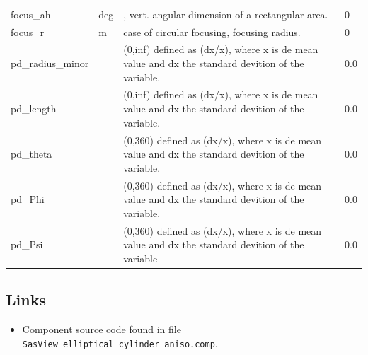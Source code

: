 \begin{longtable}{p{}p{}p{}p{}}
focus\_ah & deg & , vert. angular dimension of a rectangular area. & 0 \\
focus\_r & m & case of circular focusing, focusing radius. & 0 \\
pd\_radius\_minor &  & (0,inf) defined as (dx/x), where x is de mean value and dx the standard devition of the variable. & 0.0 \\
pd\_length &  & (0,inf) defined as (dx/x), where x is de mean value and dx the standard devition of the variable. & 0.0 \\
pd\_theta &  & (0,360) defined as (dx/x), where x is de mean value and dx the standard devition of the variable. & 0.0 \\
pd\_Phi &  & (0,360) defined as (dx/x), where x is de mean value and dx the standard devition of the variable. & 0.0 \\
pd\_Psi &  & (0,360) defined as (dx/x), where x is de mean value and dx the standard devition of the variable & 0.0 \\
\bottomrule
\end{longtable}

\subsection*{Links}
\begin{itemize}
  \item Component source code found in file \texttt{SasView\_elliptical\_cylinder\_aniso.comp}.
\end{itemize}
